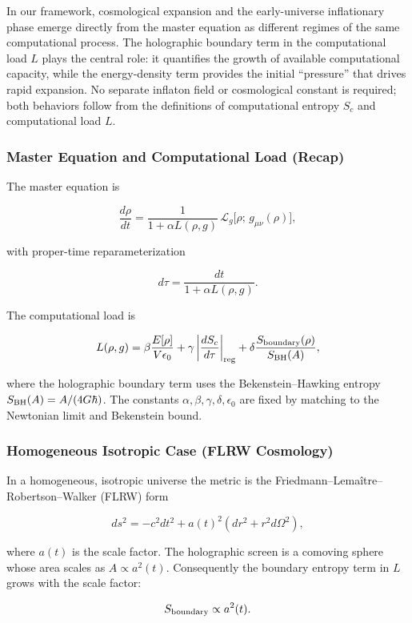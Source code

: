\documentclass[reprint,amsmath,amssymb,aps,prd,preprintnumbers,superscriptaddress,longbibliography,10pt]{revtex4-2}
\begin{document}
In our framework, cosmological expansion and the early-universe inflationary phase emerge directly from the master equation as different regimes of the same computational process. The holographic boundary term in the computational load \(L\) plays the central role: it quantifies the growth of available computational capacity, while the energy-density term provides the initial “pressure” that drives rapid expansion. No separate inflaton field or cosmological constant is required; both behaviors follow from the definitions of computational entropy \(S_c\) and computational load \(L\).

\subsubsection{Master Equation and Computational Load (Recap)}

The master equation is

\[
\frac{d\rho}{dt} = \frac{1}{1 + \alpha L(\rho,g)} \,\mathcal{L}_g\bigl[\rho;\, g_{\mu\nu}(\rho)\bigr],
\]

with proper-time reparameterization

\[
d\tau = \frac{dt}{1 + \alpha L(\rho,g)}.
\]

The computational load is

\[
L(\rho,g) = \beta \frac{E[\rho]}{V \epsilon_0} + \gamma \left| \frac{d S_c}{d\tau} \right|_{\rm reg} + \delta \frac{S_{\rm boundary}(\rho)}{S_{\rm BH}(A)},
\]

where the holographic boundary term uses the Bekenstein–Hawking entropy \(S_{\rm BH}(A) = A / (4G\hbar)\). The constants \(\alpha, \beta, \gamma, \delta, \epsilon_0\) are fixed by matching to the Newtonian limit and Bekenstein bound.

\subsubsection{Homogeneous Isotropic Case (FLRW Cosmology)}

In a homogeneous, isotropic universe the metric is the Friedmann–Lemaître–Robertson–Walker (FLRW) form

\[
ds^2 = -c^2 dt^2 + a(t)^2 \left( dr^2 + r^2 d\Omega^2 \right),
\]

where \(a(t)\) is the scale factor. The holographic screen is a comoving sphere whose area scales as \(A \propto a^2(t)\). Consequently the boundary entropy term in \(L\) grows with the scale factor:

\[
S_{\rm boundary} \propto a^2(t).
\]
\end{document}
